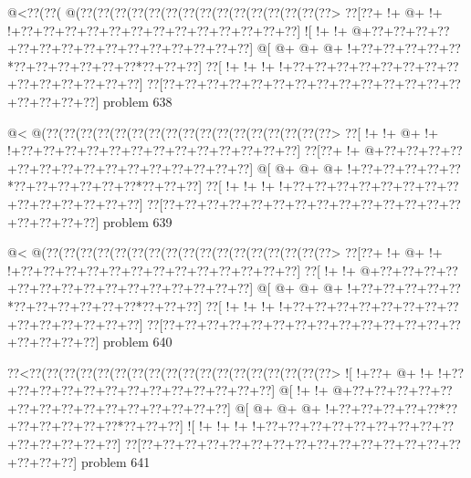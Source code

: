 \vbox{\vbox{\goo
\- @<\0??(\0??(\- @(\0??(\0??(\0??(\0??(\0??(\0??(\0??(\0??(\0??(\0??(\0??(\0??(\0??(\0??(\0??>
\0??[\0??+\- !+\- @+\- !+\- !+\0??+\0??+\0??+\0??+\0??+\0??+\0??+\0??+\0??+\0??+\0??+\0??+\0??]
\- ![\- !+\- !+\- @+\0??+\0??+\0??+\0??+\0??+\0??+\0??+\0??+\0??+\0??+\0??+\0??+\0??+\0??+\0??]
\- @[\- @+\- @+\- @+\- !+\0??+\0??+\0??+\0??+\0??*\0??+\0??+\0??+\0??+\0??+\0??*\0??+\0??+\0??]
\0??[\- !+\- !+\- !+\- !+\0??+\0??+\0??+\0??+\0??+\0??+\0??+\0??+\0??+\0??+\0??+\0??+\0??+\0??]
\0??[\0??+\0??+\0??+\0??+\0??+\0??+\0??+\0??+\0??+\0??+\0??+\0??+\0??+\0??+\0??+\0??+\0??+\0??]
}
\hfil problem 638\hfil\break
}



\vbox{\vbox{\goo
\- @<\- @(\0??(\0??(\0??(\0??(\0??(\0??(\0??(\0??(\0??(\0??(\0??(\0??(\0??(\0??(\0??(\0??(\0??>
\0??[\- !+\- !+\- @+\- !+\- !+\0??+\0??+\0??+\0??+\0??+\0??+\0??+\0??+\0??+\0??+\0??+\0??+\0??]
\0??[\0??+\- !+\- @+\0??+\0??+\0??+\0??+\0??+\0??+\0??+\0??+\0??+\0??+\0??+\0??+\0??+\0??+\0??]
\- @[\- @+\- @+\- @+\- !+\0??+\0??+\0??+\0??+\0??*\0??+\0??+\0??+\0??+\0??+\0??*\0??+\0??+\0??]
\0??[\- !+\- !+\- !+\- !+\0??+\0??+\0??+\0??+\0??+\0??+\0??+\0??+\0??+\0??+\0??+\0??+\0??+\0??]
\0??[\0??+\0??+\0??+\0??+\0??+\0??+\0??+\0??+\0??+\0??+\0??+\0??+\0??+\0??+\0??+\0??+\0??+\0??]
}
\hfil problem 639\hfil\break
}



\vbox{\vbox{\goo
\- @<\- @(\0??(\0??(\0??(\0??(\0??(\0??(\0??(\0??(\0??(\0??(\0??(\0??(\0??(\0??(\0??(\0??(\0??>
\0??[\0??+\- !+\- @+\- !+\- !+\0??+\0??+\0??+\0??+\0??+\0??+\0??+\0??+\0??+\0??+\0??+\0??+\0??]
\0??[\- !+\- !+\- @+\0??+\0??+\0??+\0??+\0??+\0??+\0??+\0??+\0??+\0??+\0??+\0??+\0??+\0??+\0??]
\- @[\- @+\- @+\- @+\- !+\0??+\0??+\0??+\0??+\0??*\0??+\0??+\0??+\0??+\0??+\0??*\0??+\0??+\0??]
\0??[\- !+\- !+\- !+\- !+\0??+\0??+\0??+\0??+\0??+\0??+\0??+\0??+\0??+\0??+\0??+\0??+\0??+\0??]
\0??[\0??+\0??+\0??+\0??+\0??+\0??+\0??+\0??+\0??+\0??+\0??+\0??+\0??+\0??+\0??+\0??+\0??+\0??]
}
\hfil problem 640\hfil\break
}



\vbox{\vbox{\goo
\0??<\0??(\0??(\0??(\0??(\0??(\0??(\0??(\0??(\0??(\0??(\0??(\0??(\0??(\0??(\0??(\0??(\0??(\0??>
\- ![\- !+\0??+\- @+\- !+\- !+\0??+\0??+\0??+\0??+\0??+\0??+\0??+\0??+\0??+\0??+\0??+\0??+\0??]
\- @[\- !+\- !+\- @+\0??+\0??+\0??+\0??+\0??+\0??+\0??+\0??+\0??+\0??+\0??+\0??+\0??+\0??+\0??]
\- @[\- @+\- @+\- @+\- !+\0??+\0??+\0??+\0??+\0??*\0??+\0??+\0??+\0??+\0??+\0??*\0??+\0??+\0??]
\- ![\- !+\- !+\- !+\- !+\0??+\0??+\0??+\0??+\0??+\0??+\0??+\0??+\0??+\0??+\0??+\0??+\0??+\0??]
\0??[\0??+\0??+\0??+\0??+\0??+\0??+\0??+\0??+\0??+\0??+\0??+\0??+\0??+\0??+\0??+\0??+\0??+\0??]
}
\hfil problem 641\hfil\break
}



